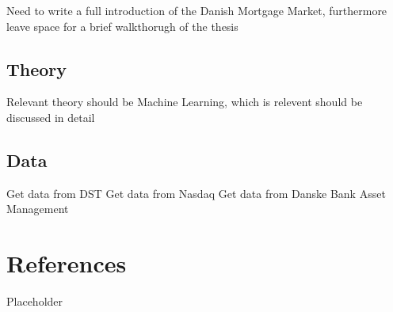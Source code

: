\documentclass[12pt,twoside]{reedthesis}
\begin{document}
Need to write a full introduction of the Danish Mortgage Market, furthermore
leave space for a brief walkthorugh of the thesis

\hypertarget{theory}{%
\section*{Theory}\label{theory}}

Relevant theory should be Machine Learning, which is relevent should be discussed
in detail

\hypertarget{data}{%
\section*{Data}\label{data}}

Get data from DST
Get data from Nasdaq
Get data from Danske Bank Asset Management

\hypertarget{references}{%
\chapter*{References}\label{references}}

Placeholder


\end{document}
